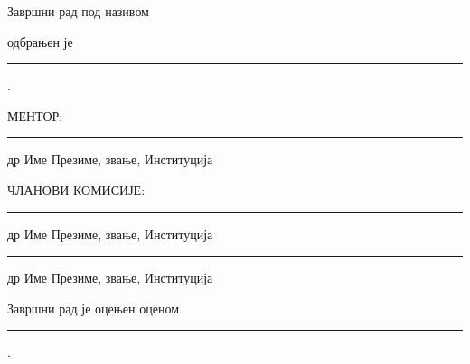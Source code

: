 \pagebreak

\thispagestyle{empty}





\vspace*{2cm}

Завршни рад под називом \vspace*{3mm}

\vspace*{3mm}

\noindent одбрањен је \rule{3cm}{0.5pt}.
\vspace*{2cm}


\noindent МЕНТОР:
\vspace*{1cm}

\noindent \rule{7cm}{0.5pt}

\noindent др Име Презиме, звање, Институција
\vspace*{2cm}

 

{\phantom{a}\hfill ЧЛАНОВИ
КОМИСИЈЕ:\qquad\qquad\qquad}
\vspace*{1cm}

\noindent\hspace*{6cm}\rule{7cm}{0.5pt}

\noindent\hspace*{6cm} др Име Презиме, звање, Институција
\vspace*{1cm}

\noindent\hspace*{6cm}\rule{7cm}{0.5pt}

\noindent\hspace*{6cm} др Име Презиме, звање, Институција

\vspace*{2cm}

Завршни рад је оцењен оценом \rule{3cm}{0.5pt}.
